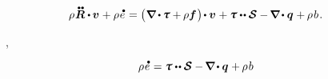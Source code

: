 \nopagebreak\en{\vspace{-0.16em}}\ru{\vspace{-0.66em}}\begin{equation*}
\rho \hspace{.15ex} \mathdotdotabove{\bm{R}} \dotp \hspace{-0.1ex} \bm{v} \hspace{.1ex} + \rho \hspace{.15ex} \mathdotabove{e}
\hspace{.15ex}
=
\bigl( \hspace{.1ex} \boldnabla \hspace{-0.1ex} \dotp \hspace{-0.1ex} \cauchystress + \hspace{-0.1ex} \rho \bm{f} \hspace{.15ex} \bigr) \hspace{-0.25ex} \dotp \bm{v} \hspace{.1ex}
+ \cauchystress \dotdotp \strainratetensor
- \hspace{-0.16ex} \boldnabla \hspace{-0.15ex} \dotp \heatfluxvector \hspace{.1ex} + \hspace{-0.1ex} \rho \hspace{.2ex} b
\hspace{.2ex} .
\end{equation*}

\vspace{-0.15em}\noindent
{}~~,

\nopagebreak\vspace{-0.16em}\begin{equation}\label{thermodynamics:balanceofenergy.local}
\rho \hspace{.15ex} \mathdotabove{e} \hspace{.1ex}
=
\cauchystress \dotdotp \strainratetensor
- \hspace{-0.16ex} \boldnabla \hspace{-0.15ex} \dotp \heatfluxvector \hspace{.1ex} + \hspace{-0.1ex} \rho \hspace{.2ex} b
\end{equation}

